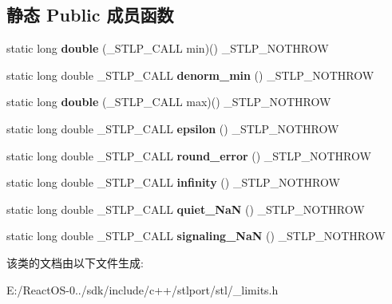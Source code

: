 \subsection*{静态 Public 成员函数}
\begin{DoxyCompactItemize}
\item 
\mbox{\label{classnumeric__limits_3_01long_01double_01_4_a636e3991c5264e0653e7908b466c3332}} 
static long {\bfseries double} (\+\_\+\+S\+T\+L\+P\+\_\+\+C\+A\+LL min)() \+\_\+\+S\+T\+L\+P\+\_\+\+N\+O\+T\+H\+R\+OW
\item 
\mbox{\label{classnumeric__limits_3_01long_01double_01_4_a03cc90c4a2558e0aa16f17698f211586}} 
static long double \+\_\+\+S\+T\+L\+P\+\_\+\+C\+A\+LL {\bfseries denorm\+\_\+min} () \+\_\+\+S\+T\+L\+P\+\_\+\+N\+O\+T\+H\+R\+OW
\item 
\mbox{\label{classnumeric__limits_3_01long_01double_01_4_ae91a437c77d44e8a40141c6e0c2bc050}} 
static long {\bfseries double} (\+\_\+\+S\+T\+L\+P\+\_\+\+C\+A\+LL max)() \+\_\+\+S\+T\+L\+P\+\_\+\+N\+O\+T\+H\+R\+OW
\item 
\mbox{\label{classnumeric__limits_3_01long_01double_01_4_af88456e14fb10a010521729c94803ce8}} 
static long double \+\_\+\+S\+T\+L\+P\+\_\+\+C\+A\+LL {\bfseries epsilon} () \+\_\+\+S\+T\+L\+P\+\_\+\+N\+O\+T\+H\+R\+OW
\item 
\mbox{\label{classnumeric__limits_3_01long_01double_01_4_ad7c3e94a89d7676495c4b391975d6ae7}} 
static long double \+\_\+\+S\+T\+L\+P\+\_\+\+C\+A\+LL {\bfseries round\+\_\+error} () \+\_\+\+S\+T\+L\+P\+\_\+\+N\+O\+T\+H\+R\+OW
\item 
\mbox{\label{classnumeric__limits_3_01long_01double_01_4_ab5283f7fb166c532cafe91ffbb3cf2f8}} 
static long double \+\_\+\+S\+T\+L\+P\+\_\+\+C\+A\+LL {\bfseries infinity} () \+\_\+\+S\+T\+L\+P\+\_\+\+N\+O\+T\+H\+R\+OW
\item 
\mbox{\label{classnumeric__limits_3_01long_01double_01_4_a8aa80a719daa668056fcff6fa30a74b5}} 
static long double \+\_\+\+S\+T\+L\+P\+\_\+\+C\+A\+LL {\bfseries quiet\+\_\+\+NaN} () \+\_\+\+S\+T\+L\+P\+\_\+\+N\+O\+T\+H\+R\+OW
\item 
\mbox{\label{classnumeric__limits_3_01long_01double_01_4_a6256bee387a15cda72b9f10c2d46e701}} 
static long double \+\_\+\+S\+T\+L\+P\+\_\+\+C\+A\+LL {\bfseries signaling\+\_\+\+NaN} () \+\_\+\+S\+T\+L\+P\+\_\+\+N\+O\+T\+H\+R\+OW
\end{DoxyCompactItemize}


该类的文档由以下文件生成\+:\begin{DoxyCompactItemize}
\item 
E\+:/\+React\+O\+S-\/0../sdk/include/c++/stlport/stl/\+\_\+limits.\+h\end{DoxyCompactItemize}
